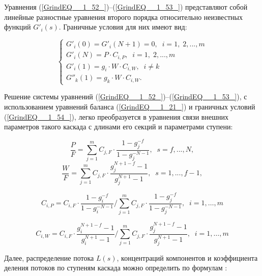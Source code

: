 Уравнения (\ref{GrindEQ__1_52_})--(\ref{GrindEQ__1_53_}) представляют собой линейные разностные уравнения второго порядка относительно неизвестных функций $G'_{i} (s)$. Граничные условия для них имеют вид:

\begin{equation} \label{GrindEQ__1_54_} 
  \left\{\begin{array}{l} {G'_{i} (0)=G'_{i} (N+1)=0,\; \; i=1,\; 2,...,m} \\
    {G'_{i} (N)=P \cdot C_{i,P} ,\; \; i=1,\; 2,...,m} \\
    {G'_{i} (1)=g_{i} \cdot W \cdot C_{i,W} ,\; \; i\ne k} \\
    {G''_{k} (1)=g_{k} \cdot W \cdot C_{i,W} .} \end{array}\right.  
\end{equation} 

Решение системы уравнений (\ref{GrindEQ__1_52_})--(\ref{GrindEQ__1_53_}), с использованием уравнений баланса (\ref{GrindEQ__1_21_}) и граничных условий (\ref{GrindEQ__1_54_}), легко преобразуется в уравнения связи внешних параметров такого каскада с длинами его секций и параметрами ступени:

\begin{equation} \label{GrindEQ__1_55_} 
  \frac{P}{F} =\sum _{j=1}^{m}C_{j,F} \cdot \frac{1-g_{j}^{-f} }{1-g_{j}^{-N-1}} ,\; \; s=f,...,N ,                                                  
  \end{equation} 
  \begin{equation} \label{GrindEQ__1_56_} 
  \frac{W}{F} =\sum _{j=1}^{m}C_{j,F} \cdot \frac{g_{j}^{N+1-f} -1}{g_{j}^{N+1} -1} ,\; \; s=1,...,f-1 ,                                            
\end{equation}

\begin{equation} \label{GrindEQ__1_57_} 
  C_{i,P}=C_{i,F} \cdot \frac{1-g_{i}^{-f}}{1-g_{i}^{-N-1}} / \sum_{j=1}^{m} C_{j,F} \cdot \frac{1-g_{j}^{-f}}{1-g_{j}^{-N-1}},\; \;  i=1, \ldots, m                             
\end{equation}

\begin{equation} \label{GrindEQ__1_58_} 
  C_{i,W}=C_{i,F} \cdot \frac{g_{i}^{N+1-f}-1}{g_{i}^{N+1}-1} / \sum_{j=1}^{m} C_{j,F} \cdot \frac{g_{j}^{N+1-f}-1}{g_{j}^{N+1}-1},\; \;  i=1, \ldots, m                         
\end{equation} 

Далее, распределение потока $L(s)$, концентраций компонентов и коэффициента деления потоков по ступеням каскада можно определить по формулам \cite{sulaberidzeTeoriyaKaskadovDlya2011}:

